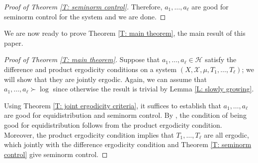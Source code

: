 \documentclass[11pt]{amsart}
\newtheorem{proposition}[lemma]{Proposition}
\theoremstyle{definition}
\newcommand{\N}{{\mathbb N}}
\newcommand{\CH}{{\mathcal H}}
\newcommand{\CQ}{{\mathcal Q}}
\newcommand{\CX}{{\mathcal X}}
\newcommand{\be}{{\mathbf{e}}}
\newcommand{\bv}{{\mathbf{v}}}
\newcommand{\e}{\varepsilon}%
\newcommand{\nnorm}[1]{\lvert\!|\!| #1|\!|\!\rvert}
\newcommand{\1}{{\mathbf{1}}}
\begin{document}
\begin{proof}[Proof of Theorem \ref{T: seminorm control}]
Therefore, $a_{1},\dots,a_{\ell}$ are good for seminorm control for the system and we are done.
\end{proof}

We are now ready to prove Theorem \ref{T: main theorem}, the main result of this paper.

\begin{proof}[Proof of Theorem \ref{T: main theorem}]
Suppose that $a_{1},\dots,a_{\ell}\in\CH$ satisfy the difference and product ergodicity conditions on a system $(X, \CX, \mu, T_1, \ldots, T_\ell)$; we will show that they are jointly ergodic. Again, we can assume that $a_1, \ldots, a_\ell\succ \log$ since otherwise the result is trivial by Lemma \ref{L: slowly growing}.

Using Theorem \ref{T: joint ergodicity criteria}, it suffices to establish that $a_1, \ldots, a_\ell$ are good for  equidistribution and seminorm control. By \cite[Corollary 12.5]{DKKST24}, the condition of being good for equidistribution follows from the product ergodicity condition. Moreover, the product ergodicity condition implies that $T_1, \ldots, T_\ell$ are all ergodic, which jointly with the difference ergodicity condition and Theorem \ref{T: seminorm control} give seminorm control.
\end{proof}
\end{document}
